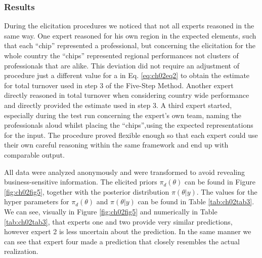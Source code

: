 \documentclass[openright,titlepage,12pt,a4paper]{book}
\begin{document}
\hypertarget{results-2}{%
\subsubsection{Results}\label{results-2}}

During the elicitation procedures we noticed that not all experts reasoned in the same way. One expert reasoned for his own region in the expected elements, such that each ``chip'' represented a professional, but concerning the elicitation for the whole country the ``chips'' represented regional performances not clusters of professionals that are alike. This deviation did not require an adjustment of procedure just a different value for a in Eq. \eqref{eq:ch02eq2} to obtain the estimate for total turnover used in step 3 of the Five-Step Method. Another expert directly reasoned in total turnover when considering country wide performance and directly provided the estimate used in step 3. A third expert started, especially during the test run concerning the expert's own team, naming the professionals aloud whilst placing the ``chips'',using the expected representations for the input. The procedure proved flexible enough so that each expert could use their own careful reasoning within the same framework and end up with comparable output.

All data were analyzed anonymously and were transformed to avoid revealing business-sensitive information. The elicited priors \(\pi_d(\theta)\) can be found in Figure \ref{fig:ch02fig5}, together with the posterior distribution \(\pi(\theta|y)\). The values for the hyper parameters for \(\pi_d(\theta)\) and \(\pi(\theta|y)\) can be found in Table \ref{tab:ch02tab3}. We can see, visually in Figure \ref{fig:ch02fig5} and numerically in Table \ref{tab:ch02tab3}, that experts one and two provide very similar predictions, however expert 2 is less uncertain about the prediction. In the same manner we can see that expert four made a prediction that closely resembles the actual realization.
\end{document}
